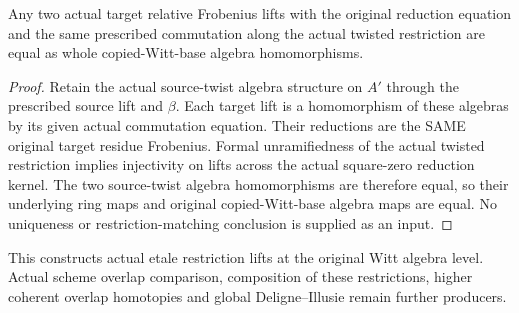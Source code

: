 \begin{theorem}
\label{thm:witt-two-etale-restricted-lift-unique}
\leanok
Any two actual target relative Frobenius lifts with the original
reduction equation and the same prescribed commutation along the
actual twisted restriction are equal as whole copied-Witt-base
algebra homomorphisms.
\end{theorem}
\begin{proof}
Retain the actual source-twist algebra structure on $A'$ through
the prescribed source lift and $\beta$. Each target lift is a
homomorphism of these algebras by its given actual commutation
equation. Their reductions are the SAME original target residue
Frobenius. Formal unramifiedness of the actual twisted restriction
implies injectivity on lifts across the actual square-zero
reduction kernel. The two source-twist algebra homomorphisms are
therefore equal, so their underlying ring maps and original
copied-Witt-base algebra maps are equal. No uniqueness or
restriction-matching conclusion is supplied as an input.
\end{proof}

This constructs actual etale restriction lifts at the original
Witt algebra level. Actual scheme overlap comparison, composition of these restrictions, higher coherent overlap
homotopies and global Deligne--Illusie remain further producers.

